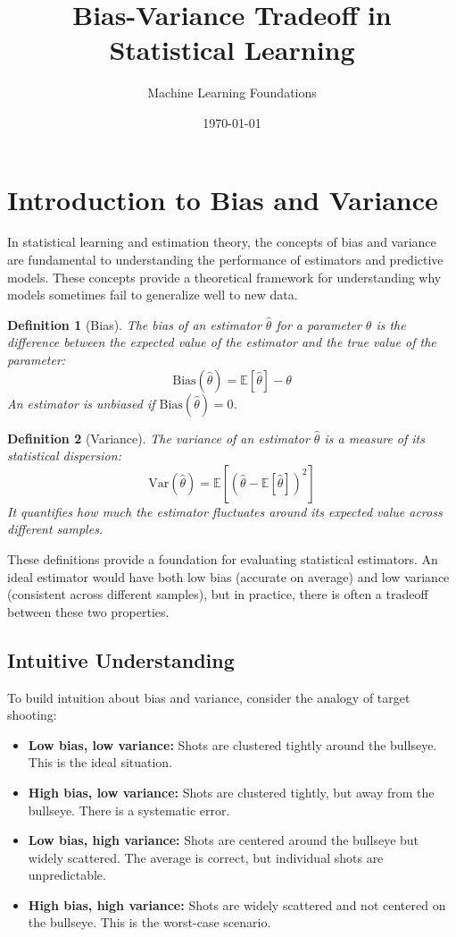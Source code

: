 \documentclass{article}
\title{Bias-Variance Tradeoff in Statistical Learning}
\author{Machine Learning Foundations}
\date{\today}
\newtheorem{definition}{Definition}
\begin{document}
\maketitle
\tableofcontents

\section{Introduction to Bias and Variance}

In statistical learning and estimation theory, the concepts of bias and variance are fundamental to understanding the performance of estimators and predictive models. These concepts provide a theoretical framework for understanding why models sometimes fail to generalize well to new data.

\begin{definition}[Bias]
The bias of an estimator $\hat{\theta}$ for a parameter $\theta$ is the difference between the expected value of the estimator and the true value of the parameter:
\[
\text{Bias}(\hat{\theta}) = \mathbb{E}[\hat{\theta}] - \theta
\]
An estimator is unbiased if $\text{Bias}(\hat{\theta}) = 0$.
\end{definition}

\begin{definition}[Variance]
The variance of an estimator $\hat{\theta}$ is a measure of its statistical dispersion:
\[
\text{Var}(\hat{\theta}) = \mathbb{E}[(\hat{\theta} - \mathbb{E}[\hat{\theta}])^2]
\]
It quantifies how much the estimator fluctuates around its expected value across different samples.
\end{definition}

These definitions provide a foundation for evaluating statistical estimators. An ideal estimator would have both low bias (accurate on average) and low variance (consistent across different samples), but in practice, there is often a tradeoff between these two properties.

\subsection{Intuitive Understanding}

To build intuition about bias and variance, consider the analogy of target shooting:

\begin{itemize}
\item \textbf{Low bias, low variance:} Shots are clustered tightly around the bullseye. This is the ideal situation.
\item \textbf{High bias, low variance:} Shots are clustered tightly, but away from the bullseye. There is a systematic error.
\item \textbf{Low bias, high variance:} Shots are centered around the bullseye but widely scattered. The average is correct, but individual shots are unpredictable.
\item \textbf{High bias, high variance:} Shots are widely scattered and not centered on the bullseye. This is the worst-case scenario.
\end{itemize}
\end{document}
